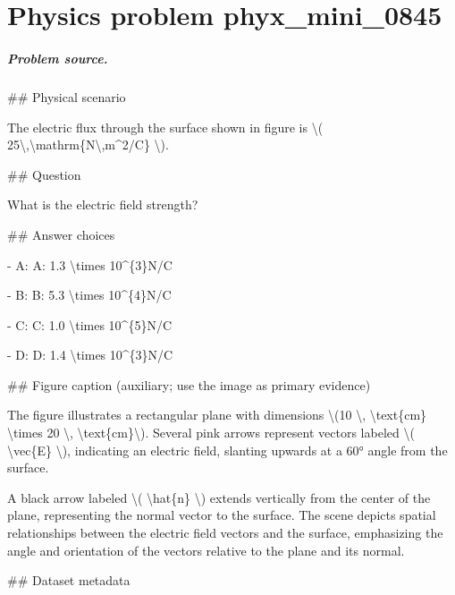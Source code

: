 
\chapter{Physics problem phyx\_mini\_0845}
\label{ch:PhyXMiniProblems_problem_phyx_mini_0845}

\paragraph{Problem source.}
\#\# Physical scenario

The electric flux through the surface shown in figure is \textbackslash{}( 25\textbackslash{},\textbackslash{}mathrm\{N\textbackslash{},m\textasciicircum{}2/C\} \textbackslash{}).

\#\# Question

What is the electric field strength?

\#\# Answer choices

- A: A: 1.3 \textbackslash{}times 10\textasciicircum{}\{3\}N/C

- B: B: 5.3 \textbackslash{}times 10\textasciicircum{}\{4\}N/C

- C: C: 1.0 \textbackslash{}times 10\textasciicircum{}\{5\}N/C

- D: D: 1.4 \textbackslash{}times 10\textasciicircum{}\{3\}N/C

\#\# Figure caption (auxiliary; use the image as primary evidence)

The figure illustrates a rectangular plane with dimensions \textbackslash{}(10 \textbackslash{}, \textbackslash{}text\{cm\} \textbackslash{}times 20 \textbackslash{}, \textbackslash{}text\{cm\}\textbackslash{}). Several pink arrows represent vectors labeled \textbackslash{}( \textbackslash{}vec\{E\} \textbackslash{}), indicating an electric field, slanting upwards at a 60° angle from the surface. 

A black arrow labeled \textbackslash{}( \textbackslash{}hat\{n\} \textbackslash{}) extends vertically from the center of the plane, representing the normal vector to the surface. The scene depicts spatial relationships between the electric field vectors and the surface, emphasizing the angle and orientation of the vectors relative to the plane and its normal.

\#\# Dataset metadata

